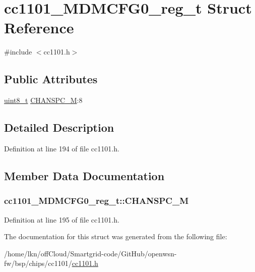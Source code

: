 \hypertarget{structcc1101___m_d_m_c_f_g0__reg__t}{}\section{cc1101\+\_\+\+M\+D\+M\+C\+F\+G0\+\_\+reg\+\_\+t Struct Reference}
\label{structcc1101___m_d_m_c_f_g0__reg__t}


{\ttfamily \#include $<$cc1101.\+h$>$}

\subsection*{Public Attributes}
\begin{DoxyCompactItemize}
\item 
\hyperlink{_p_e___types_8h_aba7bc1797add20fe3efdf37ced1182c5}{uint8\+\_\+t} \hyperlink{structcc1101___m_d_m_c_f_g0__reg__t_a4eded4aa954b19f65365931ce5a54a9b}{C\+H\+A\+N\+S\+P\+C\+\_\+M}\+:8
\end{DoxyCompactItemize}


\subsection{Detailed Description}


Definition at line 194 of file cc1101.\+h.



\subsection{Member Data Documentation}
\subsubsection[{\texorpdfstring{C\+H\+A\+N\+S\+P\+C\+\_\+M}{CHANSPC_M}}]{ cc1101\+\_\+\+M\+D\+M\+C\+F\+G0\+\_\+reg\+\_\+t\+::\+C\+H\+A\+N\+S\+P\+C\+\_\+M}\hypertarget{structcc1101___m_d_m_c_f_g0__reg__t_a4eded4aa954b19f65365931ce5a54a9b}{}\label{structcc1101___m_d_m_c_f_g0__reg__t_a4eded4aa954b19f65365931ce5a54a9b}


Definition at line 195 of file cc1101.\+h.



The documentation for this struct was generated from the following file\+:\begin{DoxyCompactItemize}
\item 
/home/lkn/off\+Cloud/\+Smartgrid-\/code/\+Git\+Hub/openwsn-\/fw/bsp/chips/cc1101/\hyperlink{cc1101_8h}{cc1101.\+h}\end{DoxyCompactItemize}
